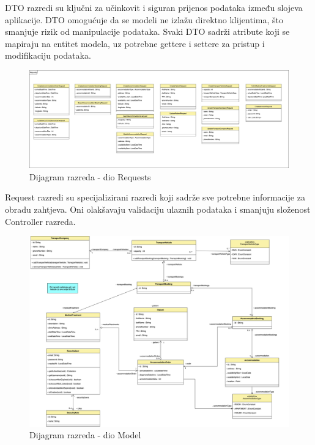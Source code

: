 			DTO razredi su ključni za učinkovit i siguran prijenos podataka između slojeva aplikacije. DTO omogućuje da se modeli ne izlažu direktno klijentima, što smanjuje rizik od manipulacije podataka. Svaki DTO sadrži atribute koji se mapiraju na entitet modela, uz potrebne gettere i settere za pristup i modifikaciju podataka.
			
			\begin{figure}[H]
				\includegraphics[scale=0.08]{slike/arhitektura_requests_class_diagram_v2.png} %
				\centering
				\caption{Dijagram razreda - dio Requests}
				\label{fig:arhitektura_requests_class_diagram}
			\end{figure}
			
			Request razredi su specijalizirani razredi koji sadrže sve potrebne informacije za obradu zahtjeva. Oni olakšavaju validaciju ulaznih podataka i smanjuju složenost Controller razreda.
			
			\begin{figure}[H]
				\includegraphics[scale=0.08]{slike/arhitektura_model_class_diagram_v2.png} %
				\centering
				\caption{Dijagram razreda - dio Model}
				\label{fig:arhitektura_model_class_diagram}
			\end{figure}
			
